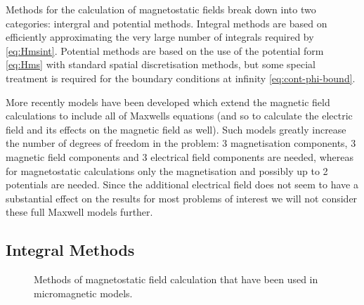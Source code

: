 Methods for the calculation of magnetostatic fields break down into two categories: intergral and potential methods.
Integral methods are based on efficiently approximating the very large number of integrals required by \cref{eq:Hmsint}.
Potential methods are based on the use of the potential form \cref{eq:Hms} with standard spatial discretisation methods, but some special treatment is required for the boundary conditions at infinity \cref{eq:cont-phi-bound}.

More recently models have been developed which extend the magnetic field calculations to include all of Maxwells equations (and so to calculate the electric field and its effects on the magnetic field as well).
Such models greatly increase the number of degrees of freedom in the problem: 3 magnetisation components, 3 magnetic field components and 3 electrical field components are needed, whereas for magnetostatic calculations only the magnetisation and possibly up to 2 potentials are needed.
Since the additional electrical field does not seem to have a substantial effect on the results for most problems of interest we will not consider these full Maxwell models further.

\subsection{Integral Methods}
\label{sec:magstat-field-calc-inte}

\begin{figure}
  \centering
  \caption{Methods of magnetostatic field calculation that have been used in micromagnetic models.}
  \label{fig:types-mag-stat}
\end{figure}

